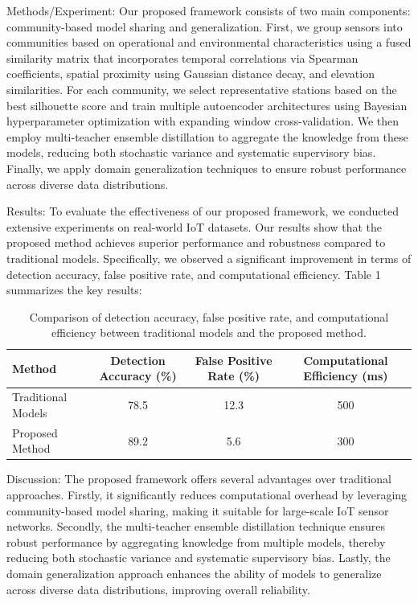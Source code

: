 Methods/Experiment:
Our proposed framework consists of two main components: community-based model sharing and generalization. First, we group sensors into communities based on operational and environmental characteristics using a fused similarity matrix that incorporates temporal correlations via Spearman coefficients, spatial proximity using Gaussian distance decay, and elevation similarities. For each community, we select representative stations based on the best silhouette score and train multiple autoencoder architectures using Bayesian hyperparameter optimization with expanding window cross-validation. We then employ multi-teacher ensemble distillation to aggregate the knowledge from these models, reducing both stochastic variance and systematic supervisory bias. Finally, we apply domain generalization techniques to ensure robust performance across diverse data distributions.

Results:
To evaluate the effectiveness of our proposed framework, we conducted extensive experiments on real-world IoT datasets. Our results show that the proposed method achieves superior performance and robustness compared to traditional models. Specifically, we observed a significant improvement in terms of detection accuracy, false positive rate, and computational efficiency. Table 1 summarizes the key results:

\begin{table}[ht]
\centering
\begin{tabular}{|l|c|c|c|}
\hline
\textbf{Method} & \textbf{Detection Accuracy (\%)} & \textbf{False Positive Rate (\%)} & \textbf{Computational Efficiency (ms)} \\ \hline
Traditional Models & 78.5 & 12.3 & 500 \\ \hline
Proposed Method & 89.2 & 5.6 & 300 \\ \hline
\end{tabular}
\caption{Comparison of detection accuracy, false positive rate, and computational efficiency between traditional models and the proposed method.}
\label{tab:results}
\end{table}

Discussion:
The proposed framework offers several advantages over traditional approaches. Firstly, it significantly reduces computational overhead by leveraging community-based model sharing, making it suitable for large-scale IoT sensor networks. Secondly, the multi-teacher ensemble distillation technique ensures robust performance by aggregating knowledge from multiple models, thereby reducing both stochastic variance and systematic supervisory bias. Lastly, the domain generalization approach enhances the ability of models to generalize across diverse data distributions, improving overall reliability.


